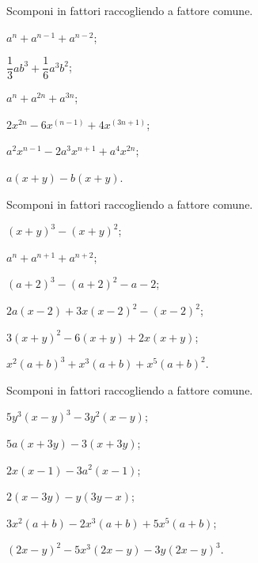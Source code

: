 \begin{esercizio}[\Ast]
\label{ese:13.9}
Scomponi in fattori raccogliendo a fattore comune.
\begin{multicols}{2}
\begin{enumeratea}
 \item $a^{n}+a^{n-1}+a^{n-2}$;
 \item $\dfrac{1}{3}ab^{3}+\dfrac{1}{6}a^{3}b^{2}$;
 \item $a^{n}+a^{2n}+a^{3n}$;
 \item $2x^{2n}-6x^{(n-1)}+4x^{(3n+1)}$;
 \item $a^{2}x^{n-1}-2a^{3}x^{n+1}+a^{4}x^{2n}$;
 \item $a(x+y)-b(x+y)$.
\end{enumeratea}
\end{multicols}
\end{esercizio}

\begin{esercizio}[\Ast]
\label{ese:13.10}
Scomponi in fattori raccogliendo a fattore comune.
\begin{multicols}{2}
\begin{enumeratea}
 \item $(x+y)^{3}-(x+y)^{2}$;
 \item $a^{n}+a^{n+1}+a^{n+2}$;
 \item $(a+2)^{3}-(a+2)^{2}-a-2$;
 \item $2a(x-2)+3x(x-2)^{2}-(x-2)^{2}$;
 \item $3(x+y)^{2}-6(x+y)+2x(x+y)$;
 \item $x^{2}(a+b)^{3}+x^{3}(a+b)+x^{5}(a+b)^{2}$.
\end{enumeratea}
\end{multicols}
\end{esercizio}

\begin{esercizio}[\Ast]
Scomponi in fattori raccogliendo a fattore comune.
\label{ese:13.11}
 \begin{multicols}{2}
 \begin{enumeratea}
 \item $5y^{3}(x-y)^{3}-3y^{2}(x-y)$;
 \item $5a(x+3y)-3(x+3y)$;
 \item $2x(x-1)-3a^{2}(x-1)$;
 \item $2(x-3y)-y(3y-x)$;
 \item $3x^{2}(a+b)-2x^{3}(a+b)+5x^{5}(a+b)$;
 \item $(2x-y)^{2}-5x^{3}(2x-y)-3y(2x-y)^{3}$.
\end{enumeratea}
 \end{multicols}
\end{esercizio}

